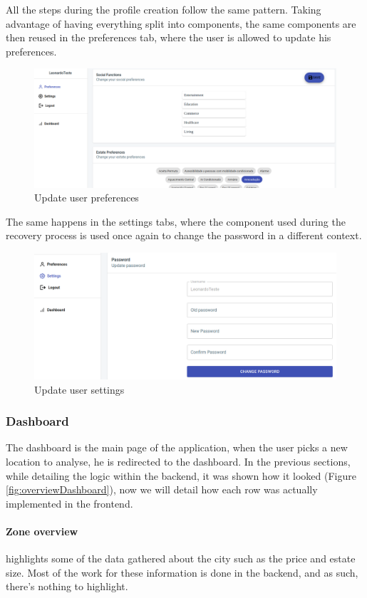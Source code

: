 All the steps during the profile creation follow the same pattern. Taking advantage of having everything split into components, the same components are then reused in the preferences tab, where the user is allowed to update his preferences.

\begin{figure}[h]
	\centering
	\includegraphics[width=0.6\linewidth]{Chapters/img/frontend/UserPreferences.png}
	\caption{Update user preferences}
	\label{fig:userPreferences}
\end{figure}

The same happens in the settings tabs, where the component used during the recovery process is used once again to change the password in a different context.

\begin{figure}[h]
	\centering
	\includegraphics[width=0.6\linewidth]{Chapters/img/frontend/UserSettings.png}
	\caption{Update user settings}
	\label{fig:userSettings}
\end{figure}


\subsubsection{Dashboard} 
\label{sss:dashboard}

The dashboard is the main page of the application, when the user picks a new location to analyse, he is redirected to the dashboard. In the previous sections, while detailing the logic within the backend, it was shown how it looked (Figure \ref{fig:overviewDashboard}), now we will detail how each row was actually implemented in the frontend.

\paragraph{Zone overview} highlights some of the data gathered about the city such as the price and estate size. Most of the work for these information is done in the backend, and as such, there's nothing to highlight.

